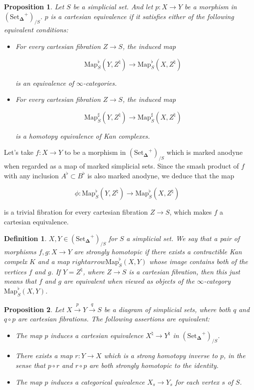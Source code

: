 \documentclass[12pt]{amsart}
\newcommand{\8}{\ensuremath{\infty}}
\newcommand{\SSet}{\ensuremath{\text{Set}_{\boldsymbol{\Delta}}}}
\newcommand{\Map}{\ensuremath{\text{Map}}}
\newtheorem{definition}{Definition}
\newtheorem{proposition}{Proposition}
\begin{document}
\begin{proposition}
  Let $S$ be a simplicial set. And let $p: X \rightarrow Y$ be a morphism in $(\SSet^+)_{/S}$. $p$ is a cartesian equivalence if it satisfies either of the following equivalent conditions:
  \begin{itemize}
    \item[(1)] For every cartesian fibration $Z \rightarrow S$, the induced map

      $$
        \Map^\flat_S(Y, Z^\natural) \rightarrow \Map_S^\flat(X, Z^\natural)
      $$

      is an equivalence of \8-categories.
    \item[(2)] For every cartesian fibration $Z \rightarrow S$, the induced map

      $$
        \Map^\sharp_S(Y, Z^\natural) \rightarrow \Map_S^\sharp(X, Z^\natural)
      $$

      is a homotopy equivalence of Kan complexes.
  \end{itemize}
\end{proposition}

Let's take $f: X \rightarrow Y$ to be a morphism in $(\SSet^+)_{/S}$ which is marked anodyne when regarded as a map of marked simplicial sets. Since the smash product of $f$ with any inclusion $A^\flat\subset B^\flat$ is also marked anodyne, we deduce that the map

$$
  \phi: \Map_S^\flat(Y, Z^\natural) \rightarrow \Map_S^\flat(X, Z^\natural)
$$

is a trivial fibration for every cartesian fibration $Z \rightarrow S$, which makes $f$ a cartesian equivalence.

\begin{definition}
  $X, Y \in (\SSet^+)_{/S}$ for $S$ a simplicial set. We say that a pair of morphisms $f, g: X \rightarrow Y$ are strongly homotopic if there exists a contractible Kan compelx $K$ and a map $rightarrow \Map^\flat_S(X, Y)$ whose image contains both of the vertices $f$ and $g$. If $Y = Z^\natural$, where $Z \rightarrow S$ is a cartesian fibration, then this just means that $f$ and $g$ are equivalent when viewed as objects of the \8-category $\Map_S^\flat(X, Y)$.
\end{definition}

\begin{proposition}
  Let $X \xrightarrow{p} Y \xrightarrow{q} S$ be a diagram of simplicial sets, where both $q$ and $q\circ p$ are cartesian fibrations. The following assertions are equivalent:
  \begin{itemize}
    \item[(1)] The map $p$ induces a cartesian equivalence $X^\natural \rightarrow Y^\natural$ in $(\SSet^+)_{/S}$.
    \item[(2)] There exists a map $r: Y \rightarrow X$ which is a strong homotopy inverse to $p$, in the sense that $p\circ r$ and $r\circ p$ are both strongly homotopic to the identity.
    \item[(3)] The map $p$ induces a categorical quivalence $X_s \rightarrow Y_s$ for each vertex $s$ of $S$.
  \end{itemize}
\end{proposition}
\end{document}
